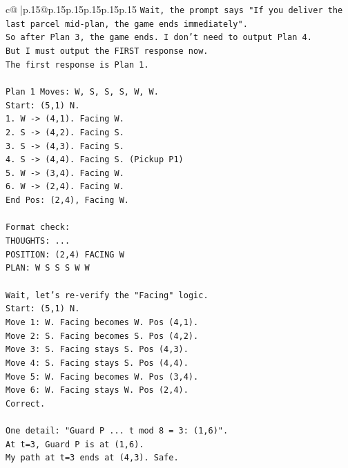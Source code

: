 \documentclass{article}
\begin{document}
{\begin{supertabular}{c@{$\;$}|p{.15\linewidth}@{}p{.15\linewidth}p{.15\linewidth}p{.15\linewidth}p{.15\linewidth}p{.15\linewidth}}
{{{\texttt{Wait, the prompt says "If you deliver the last parcel mid{-}plan, the game ends immediately".} \\
\texttt{So after Plan 3, the game ends. I don't need to output Plan 4.} \\
\texttt{But I must output the FIRST response now.} \\
\texttt{The first response is Plan 1.} \\
\\ 
\texttt{Plan 1 Moves: W, S, S, S, W, W.} \\
\texttt{Start: (5,1) N.} \\
\texttt{1. W {-}> (4,1). Facing W.} \\
\texttt{2. S {-}> (4,2). Facing S.} \\
\texttt{3. S {-}> (4,3). Facing S.} \\
\texttt{4. S {-}> (4,4). Facing S. (Pickup P1)} \\
\texttt{5. W {-}> (3,4). Facing W.} \\
\texttt{6. W {-}> (2,4). Facing W.} \\
\texttt{End Pos: (2,4), Facing W.} \\
\\ 
\texttt{Format check:} \\
\texttt{THOUGHTS: ...} \\
\texttt{POSITION: (2,4) FACING W} \\
\texttt{PLAN: W S S S W W} \\
\\ 
\texttt{Wait, let's re{-}verify the "Facing" logic.} \\
\texttt{Start: (5,1) N.} \\
\texttt{Move 1: W. Facing becomes W. Pos (4,1).} \\
\texttt{Move 2: S. Facing becomes S. Pos (4,2).} \\
\texttt{Move 3: S. Facing stays S. Pos (4,3).} \\
\texttt{Move 4: S. Facing stays S. Pos (4,4).} \\
\texttt{Move 5: W. Facing becomes W. Pos (3,4).} \\
\texttt{Move 6: W. Facing stays W. Pos (2,4).} \\
\texttt{Correct.} \\
\\ 
\texttt{One detail: "Guard P ... t mod 8 = 3: (1,6)".} \\
\texttt{At t=3, Guard P is at (1,6).} \\
\texttt{My path at t=3 ends at (4,3). Safe.} \\
}}}
\end{supertabular}}
\end{document}
